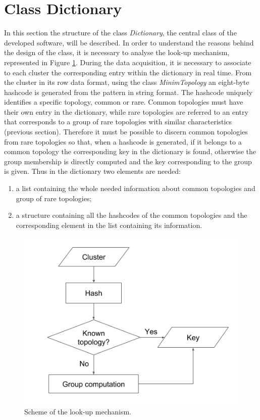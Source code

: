 \section{Class Dictionary}
In this section the structure of the class \textit{Dictionary}, the central class of the developed software, will be described. In order to understand the reasons behind the design of the class, it is necessary to analyse the look-up mechanism, represented in Figure \ref{fig:lucap}. During the data acquisition, it is necessary to associate to each cluster the corresponding entry within the dictionary in real time. From the cluster in its row data format, using the class \textit{MinimTopology} an eight-byte hashcode is generated from the pattern in string format. The hashcode uniquely identifies a specific topology, common or rare.
Common topologies must have their own entry in the dictionary, while rare topologies are referred to an entry that corresponds to a group of rare topologies with similar characteristics (previous section).
Therefore it must be possible to discern common topologies from rare topologies so that, when a hashcode is generated, if it belongs to a common topology the corresponding key in the dictionary is found, otherwise the group membership is directly computed and the key corresponding to the group is given. Thus in the dictionary two elements are needed:
\begin{enumerate}
 \item a list containing the whole needed information about common topologies and group of rare topologies;
 \item a structure containing all the hashcodes of the common topologies and the corresponding element in the list containing its information.
\end{enumerate}
%
\begin{figure}
  \centering
  \includegraphics[scale=0.5]{figures/lucap.png}
  \caption{Scheme of the look-up mechanism.}
  \label{fig:lucap}
\end{figure}
%
